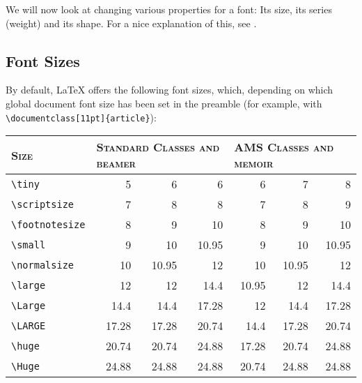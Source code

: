 \documentclass[a4paper,oneside,11pt]{article}
\newcommand\comm[1]{\texttt{\textbackslash#1}}
\newcommand\code[1]{\texttt{#1}}
\begin{document}
We  will  now look  at  changing  various  properties  for a  font: Its  size,
its  series (weight)  and  its  shape. For a  nice  explanation  of this,  see
\cite{stackexch:bfseries-textbf}.


\subsection{Font Sizes}
\label{subsec:font-sizes}

By  default, \LaTeX{}  offers the  following font  sizes, which,  depending on
which global  document font size  has been set  in the preamble  (for example,
with \code{\textbackslash{}documentclass[11pt]\{article\}}):

\begin{center}
    \begin{tabular}{lrrrrrr}
        \toprule
        \textsc{Size} & 
        \multicolumn{3}{l}{\textsc{Standard Classes and beamer}} &
        \multicolumn{3}{l}{\textsc{AMS Classes and memoir}} \\
        \midrule
        \comm{tiny}         &  5    &  6     & 6     & 6     & 7     & 8     \\
        \comm{scriptsize}   &  7    &  8     & 8     & 7     & 8     & 9     \\
        \comm{footnotesize} &  8    &  9     & 10    & 8     & 9     & 10    \\
        \comm{small}        &  9    &  10    & 10.95 & 9     & 10    & 10.95 \\
        \comm{normalsize}   & 10    &  10.95 & 12    & 10    & 10.95 & 12    \\
        \comm{large}        & 12    &  12    & 14.4  & 10.95 & 12    & 14.4  \\
        \comm{Large}        & 14.4  &  14.4  & 17.28 & 12    & 14.4  & 17.28 \\
        \comm{LARGE}        & 17.28 &  17.28 & 20.74 & 14.4  & 17.28 & 20.74 \\
        \comm{huge}         & 20.74 &  20.74 & 24.88 & 17.28 & 20.74 & 24.88 \\
        \comm{Huge}         & 24.88 &  24.88 & 24.88 & 20.74 & 24.88 & 24.88 \\
        \bottomrule
    \end{tabular}
\end{center}
\end{document}
